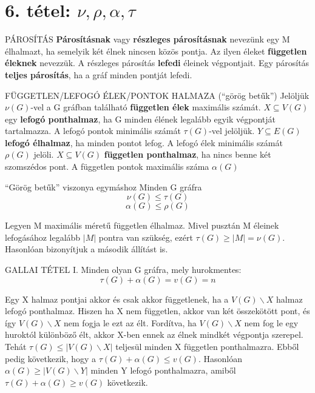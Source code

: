 \section{6. tétel: $\nu, \rho, \alpha, \tau$}

\begin{definicio}{PÁROSÍTÁS}
\textbf{Párosításnak} vagy \textbf{részleges párosításnak} nevezünk egy M élhalmazt, ha semelyik két élnek nincsen közös pontja. Az ilyen éleket \textbf{független éleknek} nevezzük. A részleges párosítás \textbf{lefedi} éleinek végpontjait. Egy párosítás \textbf{teljes párosítás}, ha a gráf minden pontját lefedi.
\end{definicio}

\begin{definicio}{FÜGGETLEN/LEFOGÓ ÉLEK/PONTOK HALMAZA (``görög betűk'')}
Jelöljük $\nu(G)$-vel a G gráfban található \textbf{független élek} maximális számát. $X \subseteq V(G)$ egy \textbf{lefogó ponthalmaz}, ha G minden élének legalább egyik végpontját tartalmazza. A lefogó pontok minimális számát $\tau(G)$-vel jelöljük. $Y \subseteq E(G)$ \textbf{lefogó élhalmaz}, ha minden pontot lefog. A lefogó élek minimális számát $\rho(G)$ jelöli. $X \subseteq V(G)$ \textbf{független ponthalmaz}, ha nincs benne két szomszédos pont. A független pontok maximális száma $\alpha(G)$
\end{definicio}

\begin{tetel}{``Görög betűk'' viszonya egymáshoz}
Minden G gráfra
$$\nu(G) \leq \tau(G)$$
$$\alpha(G) \leq \rho(G)$$
\end{tetel}

\begin{bizonyitas}{}
Legyen M maximális méretű független élhalmaz. Mivel pusztán M éleinek lefogásához legalább $|M|$ pontra van szükség, ezért $\tau(G) \geq |M| = \nu(G)$.
Hasonlóan bizonyítjuk a második állítást is.
\end{bizonyitas}

\begin{tetel}{GALLAI TÉTEL I.}
Minden olyan G gráfra, mely hurokmentes:
$$\tau(G) + \alpha(G) = v(G) = n$$
\end{tetel}

\begin{bizonyitas}{}
Egy X halmaz pontjai akkor és csak akkor függetlenek, ha a $V(G)\backslash X$ halmaz lefogó ponthalmaz. Hiszen ha X nem független, akkor van két összekötött pont, és így $V(G)\backslash X$ nem fogja le ezt az élt. Fordítva, ha $V(G)\backslash X$ nem fog le egy huroktól különböző élt, akkor X-ben ennek az élnek mindkét végpontja szerepel. Tehát $\tau(G) \leq |V(G)\backslash X|$ teljesül minden X független ponthalmazra. Ebből pedig következik, hogy a $\tau(G) + \alpha(G) \leq v(G)$. Hasonlóan $\alpha(G) \geq |V(G) \backslash Y|$ minden Y lefogó ponthalmazra, amiből $\tau(G) + \alpha(G) \geq v(G)$ következik.
\end{bizonyitas}

